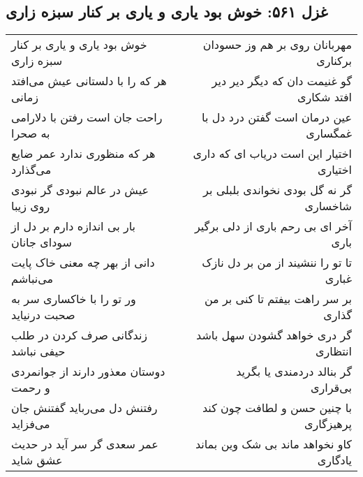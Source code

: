 \begin{center}
\section*{غزل ۵۶۱: خوش بود یاری و یاری بر کنار سبزه زاری}
\label{sec:561}
\begin{longtable}{l p{0.5cm} r}
خوش بود یاری و یاری بر کنار سبزه زاری
&&
مهربانان روی بر هم وز حسودان برکناری
\\
هر که را با دلستانی عیش می‌افتد زمانی
&&
گو غنیمت دان که دیگر دیر دیر افتد شکاری
\\
راحت جان است رفتن با دلارامی به صحرا
&&
عین درمان است گفتن درد دل با غمگساری
\\
هر که منظوری ندارد عمر ضایع می‌گذارد
&&
اختیار این است دریاب ای که داری اختیاری
\\
عیش در عالم نبودی گر نبودی روی زیبا
&&
گر نه گل بودی نخواندی بلبلی بر شاخساری
\\
بار بی اندازه دارم بر دل از سودای جانان
&&
آخر ای بی رحم باری از دلی برگیر باری
\\
دانی از بهر چه معنی خاک پایت می‌نباشم
&&
تا تو را ننشیند از من بر دل نازک غباری
\\
ور تو را با خاکساری سر به صحبت درنیاید
&&
بر سر راهت بیفتم تا کنی بر من گذاری
\\
زندگانی صرف کردن در طلب حیفی نباشد
&&
گر دری خواهد گشودن سهل باشد انتظاری
\\
دوستان معذور دارند از جوانمردی و رحمت
&&
گر بنالد دردمندی یا بگرید بی‌قراری
\\
رفتنش دل می‌رباید گفتنش جان می‌فزاید
&&
با چنین حسن و لطافت چون کند پرهیزگاری
\\
عمر سعدی گر سر آید در حدیث عشق شاید
&&
کاو نخواهد ماند بی شک وین بماند یادگاری
\\
\end{longtable}
\end{center}
